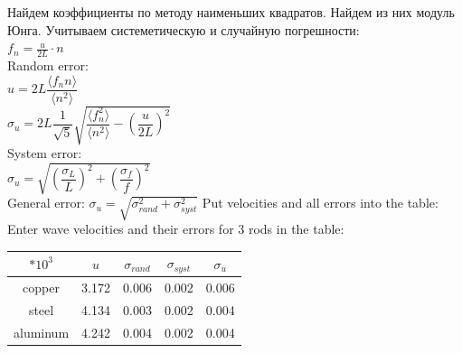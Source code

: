 \documentclass[a4paper,12pt]{article}
\begin{document}
Найдем коэффициенты по методу наименьших квадратов. Найдем из них модуль Юнга. Учитываем системетическую и случайную погрешности:\\
\(f_n = \frac{u}{2L}\cdot n\)\\
Random error:\\
\(u = 2L\dfrac{\langle f_n n \rangle}{\langle n^2 \rangle}\)\\
\(\sigma_{u} = 2L\dfrac{1}{\sqrt{5}}\sqrt{\dfrac{\langle f_n^2 \rangle}{\langle n^2 \rangle} - \left(\dfrac{u}{2L}\right)^2} \)\\

System error:\\
\(\sigma_u = \sqrt{\left(\dfrac{\sigma_L}{L}\right)^2 + \left(\dfrac{\sigma_f}{f} \right)^2} \)\\

General error:
\(\sigma_u = \sqrt{\sigma_{rand}^2 + \sigma_{syst}^2}\)
Put velocities and all errors into the table:
Enter wave velocities and their errors for 3 rods in the table:\\


\begin{tabular}{|c|c|c|c|c|}
\hline 
\(*10^3\) & \(u\) & \(\sigma_{rand} \) & \(\sigma_{syst} \) & \(\sigma_u\) \\ 
\hline 
copper & 3.172 & 0.006 & 0.002 & 0.006 \\ 
\hline 
steel & 4.134 & 0.003 & 0.002 & 0.004 \\ 
\hline 
aluminum & 4.242 & 0.004 & 0.002 & 0.004 \\ 
\hline 
\end{tabular} 
 
\end{document}
